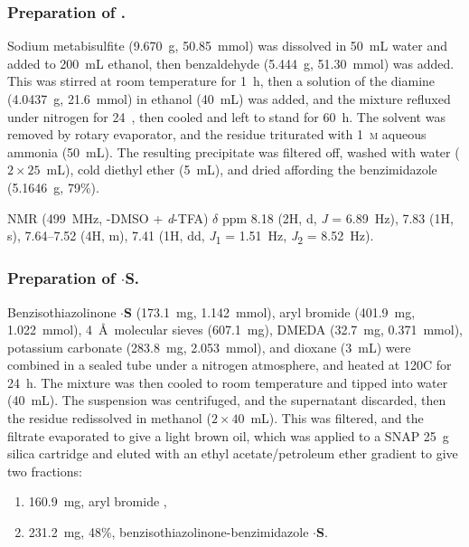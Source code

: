 \begin{refsection}
\subsubsection{Preparation of .}
Sodium metabisulfite (9.670~g, 50.85~mmol) was dissolved in 50~mL water and added to 200~mL ethanol, then benzaldehyde (5.444~g, 51.30~mmol) was added.
This was stirred at room temperature for 1~h, then a solution of the diamine  (4.0437~g, 21.6~mmol) in ethanol (40~mL) was added, and the mixture refluxed under nitrogen for 24~, then cooled and left to stand for 60~h.
The solvent was removed by rotary evaporator, and the residue triturated with 1~\textsc{m} aqueous ammonia (50~mL). 
The resulting precipitate was filtered off, washed with water ($2\times25$~mL), cold diethyl ether (5~mL), and dried affording the benzimidazole  (5.1646~g, 79\%).

 NMR (499~MHz, -DMSO + \textit{d}-TFA) $\delta$ ppm 8.18 (2H, d, \emph{J} = 6.89~Hz), 7.83 (1H, s), 7.64--7.52 (4H, m), 7.41 (1H, dd, \emph{J}\textsubscript{1} = 1.51~Hz, \emph{J}\textsubscript{2} = 8.52~Hz).

\subsubsection{Preparation of \texorpdfstring{$\cdot$\textbf{S}}{.S}.}
Benzisothiazolinone $\cdot$\textbf{S} (173.1~mg, 1.142~mmol), aryl bromide  (401.9~mg, 1.022~mmol), 4~\AA\ molecular sieves (607.1~mg), DMEDA (32.7~mg, 0.371~mmol), potassium carbonate (283.8~mg, 2.053~mmol), and dioxane (3~mL) were combined in a sealed tube under a nitrogen atmosphere, and heated at 120\degree C for 24~h.
The mixture was then cooled to room temperature and tipped into water (40~mL).
The suspension was centrifuged, and the supernatant discarded, then the residue redissolved in methanol ($2\times40$~mL).
This was filtered, and the filtrate evaporated to give a light brown oil, which was applied to a SNAP 25~g silica cartridge and eluted with an ethyl acetate/petroleum ether gradient to give two fractions:
\begin{enumerate}
    \item 160.9~mg, aryl bromide ,
    \item 231.2~mg, 48\%, benzisothiazolinone-benzimidazole $\cdot$\textbf{S}.
\end{enumerate}


\end{refsection}
